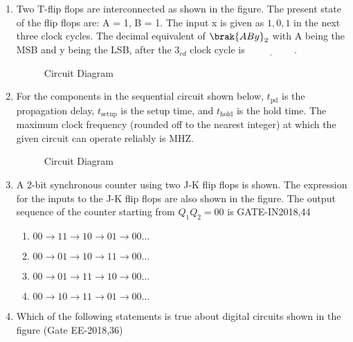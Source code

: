 \begin{enumerate}
\item Two T-flip flops are interconnected as shown in the figure. The present state of the flip flops are: A = 1, B = 1. The input x is given as $1, 0, 1$ in the next three clock cycles. The decimal equivalent of $\brak{ABy}_{2}$ with A being the MSB and y being the LSB, after the $3_{rd}$ clock cycle is $\underline{\hspace{2cm}}$.
\hfill{}
\begin{figure}[H]

\caption{Circuit Diagram}

\end{figure}

\item For the components in the sequential circuit shown below, $t_{\text{pd}}$ is the propagation delay, $t_{\text{setup}}$ is the setup time, and $t_{\text{hold}}$ is the hold time. The maximum clock frequency (rounded off to the nearest integer) at which the given circuit can operate reliably is \underline{\hspace{1cm}}MHZ.
\hfill{}

\begin{figure}[H]

\caption{Circuit Diagram}

\end{figure}

\item A 2-bit synchronous counter using two J-K flip flops is shown. The expression for the inputs to the J-K flip flops are also shown in the figure. The output sequence of the counter starting from $Q_{1}Q_{2} = 00$ is
\hfill{GATE-IN2018,44}
\begin{figure}[!ht]
\centering

\label{fig:gate_in_2018_44}
\end{figure}
\begin{enumerate}[label=\Alph*.]
\item $00 \rightarrow 11 \rightarrow 10 \rightarrow 01 \rightarrow 00 \hdots $
\item $00 \rightarrow 01 \rightarrow 10 \rightarrow 11 \rightarrow 00 \hdots $
\item $00 \rightarrow 01 \rightarrow 11 \rightarrow 10 \rightarrow 00 \hdots $
\item $00 \rightarrow 10 \rightarrow 11 \rightarrow 01 \rightarrow 00 \hdots $
\end{enumerate}

 \item Which of the following statements is true about digital circuits shown in the figure 
 \hfill{(Gate EE-2018,36)}


\end{enumerate}
